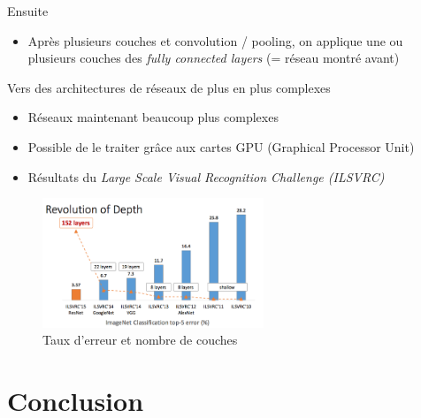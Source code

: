 \documentclass[ignorenonframetext,]{beamer}
\providecommand{\tightlist}{%
  \setlength{\itemsep}{0pt}\setlength{\parskip}{0pt}}
\begin{document}
\begin{frame}{Ensuite}

\begin{itemize}
\tightlist
\item
  Après plusieurs couches et convolution / pooling, on applique une ou
  plusieurs couches des \emph{fully connected layers} (= réseau montré
  avant)
\end{itemize}

\end{frame}

\begin{frame}{Vers des architectures de réseaux de plus en plus
complexes}

\begin{itemize}
\item
  Réseaux maintenant beaucoup plus complexes
\item
  Possible de le traiter grâce aux cartes GPU (Graphical Processor Unit)
\item
  Résultats du \emph{Large Scale Visual Recognition Challenge (ILSVRC)}
\end{itemize}

\begin{figure}
\centering
\includegraphics[width=2.60417in]{depth_error.png}
\caption{Taux d'erreur et nombre de couches}
\end{figure}

\end{frame}

\section{Conclusion}\label{conclusion}
\end{document}
